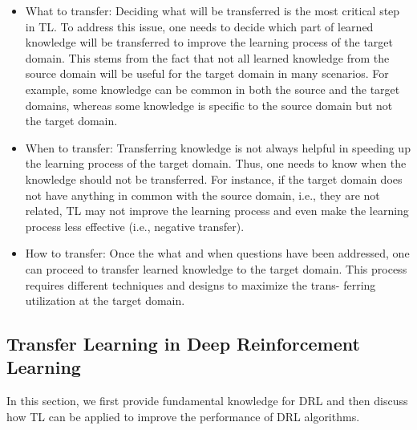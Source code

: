 \documentclass[letterpaper%
, oneside%
, 12pt%
,thesepararticles%
, english%
,creativecommons,hyperref, withAlgo2e%
]{thETS}
\begin{document}
\begin{itemize}
	\item What to transfer: Deciding what will be transferred is the most critical step in TL. To address this issue, one needs to decide which part of learned knowledge will be transferred to improve the learning process of the target domain. This stems from the fact that not all learned knowledge from the source domain will be useful for the target domain in many scenarios. For example, some knowledge can be common in both the source and the target domains, whereas some knowledge is specific to the source domain but not the target domain.
	\item When to transfer: Transferring knowledge is not always helpful in speeding up the learning process of the target domain. Thus, one needs to know when the knowledge should not be transferred. For instance, if the target domain does not have anything in common with the source domain, i.e., they are not related, TL may not improve the learning process and even make the learning process less effective (i.e., negative transfer).
	\item How to transfer: Once the what and when questions have been addressed, one can proceed to transfer learned knowledge to the target domain. This process requires different techniques and designs to maximize the trans- ferring utilization at the target domain.
\end{itemize}


\subsection{Transfer Learning in Deep Reinforcement Learning}

In this section, we first provide fundamental knowledge for DRL and then discuss how TL can be applied to improve the performance of DRL algorithms.
\end{document}
